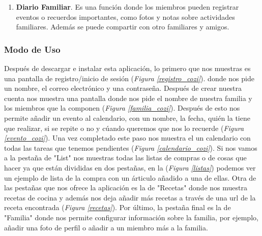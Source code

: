 \begin{enumerate}
    \begin{enumerate}
        \item Organizador de Menús. Facilita organizar las comidas con antelación y evita el estrés diario de decidir qué cocinar. 
        \item Recetas Integradas. Puedes guardar y organizar recetas directamente en la aplicación y con solo un clic. 
        \item Sincronización con el calendario. Los menús planificados pueden sincronizarse con el calendario para que toda la familia lo vea. 
    \end{enumerate}
    \item \textbf{Diario Familiar}. Es una función donde los miembros pueden registrar eventos o recuerdos importantes, como fotos y notas sobre actividades familiares. 
    Además se puede compartir con otro familiares y amigos.
\end{enumerate}

\subsubsection{Modo de Uso}
\label{subsec:uso_cozi}
Después de descargar e instalar esta aplicación, lo primero que nos muestras es una pantalla de registro/inicio de sesión (\textit{Figura \ref{registro_cozi}}).
donde nos pide un nombre, el correo electrónico y una contraseña. Después de crear nuestra cuenta nos muestra una pantalla donde nos pide 
el nombre de nuestra familia y los miembros que la componen (\textit{Figura \ref{familia_cozi}}). Después de esto nos permite añadir un evento al calendario, con
un nombre, la fecha, quién la tiene que realizar, si se repite o no y cúando queremos que nos lo recuerde (\textit{Figura \ref{evento_cozi}}). Una vez completado este 
paso nos muestra el un calendario con todas las tareas que tenemos pendientes (\textit{Figura \ref{calendario_cozi}}). Si nos vamos a la pestaña de "List"
nos muestras todas las listas de compras o de cosas que hacer ya que están divididas en dos pestañas, en la (\textit{Figura \ref{listas}}) podemos ver un ejemplo de lista 
de la compra con un árticulo añadido a una de ellas. Otra de las pestañas que nos ofrece la aplicación es la de "Recetas" donde nos muestra recetas de cocina y además nos deja 
añadir más recetas a través de una url de la receta encontrada (\textit{Figura \ref{recetas}}). Por último, la pestaña final es la de "Familia" donde nos permite configurar información sobre la familia, por ejemplo, 
añadir una foto de perfil o añadir a un miembro más a la familia. 

